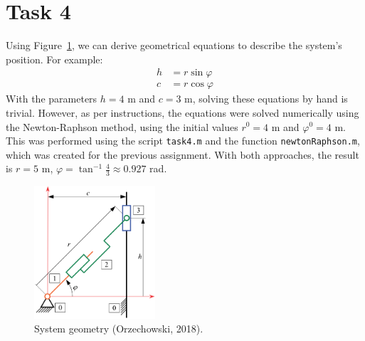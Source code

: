 \documentclass{article}
\begin{document}
\section*{Task 4}
Using Figure~\ref*{fig:system}, we can derive geometrical equations to describe the system's position. For example:
\begin{equation}
\begin{aligned}
h &= r \sin \varphi \\
c &= r \cos \varphi
\end{aligned}
\end{equation}
With the parameters $h = 4$ m and $c = 3$ m, solving these equations by hand is trivial. However, as per instructions, the equations were solved numerically using the Newton-Raphson method, using the initial values $r^0 = 4$ m and $\varphi^0 = 4$ m. This was performed using the script \texttt{task4.m} and the function \texttt{newtonRaphson.m}, which was created for the previous assignment. With both approaches, the result is $r = 5$ m, $\varphi = \tan^{-1} \frac{4}{3} \approx 0.927$ rad.

\begin{figure}[h]
	\centering
	\includegraphics[width=0.4\textwidth]{system.png}
	\caption{System geometry (Orzechowski, 2018).}
	\label{fig:system}
\end{figure}
\end{document}
